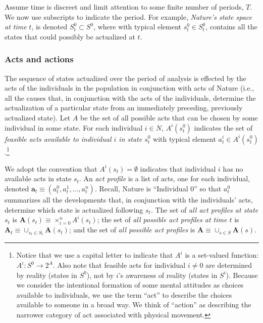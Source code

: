 \documentclass[
11pt,
titlepage,
reqno,
]{article}%
\theoremstyle{definition}
\begin{document}
	Assume time is discreet and limit attention to some finite number of periods, $T$. 
	We now use  subscripts to indicate the period. For example, \textit{Nature's state space at time} $t$, is denoted $S^0_t\subset S^0$, where with typical element $s^0_t\in S^0_t$, contains all the states that could possibly be actualized at $t$.

\subsubsection{Acts and actions\label{sec:dynamics}}
	The sequence of states actualized over the period of analysis is effected by the acts of the individuals in the population in conjunction with acts of Nature (i.e., all the causes that, in conjunction with the acts of the individuals, determine the actualization of a particular state from an immediately preceding, previously actualized state).
	Let $A$ be the set of all possible acts that can be chosen by some individual in some state.
	For each individual $i\in N$,  $A^i(s^0_t)$ indicates the set of \textit{feasible acts available to individual $i$ in state $s^0_t$} with typical element $a^i_t\in A^i(s^0_t)$.\footnote
	{
		Notice that we use a capital letter to indicate that $A^i$ is a set-valued function: $A^i:S^0\rightarrow 2^A$.
		Also note that feasible acts for individual $i\ne 0$ are determined by reality (states in $S^0$), not by $i$'s awareness of reality (states in $S^i$).
		Because we consider the intentional formation of some mental attitudes as choices available to individuals, we use the term ``act'' to describe the choices available to someone in a broad way.
		We think of ``action'' as describing the narrower category of act associated with physical movement.
	} 
	
	We adopt the convention that $A^i(s_t)=\emptyset$ indicates that individual $i$ has no available acts in state $s_t$.
	An \textit{act profile} is a list of acts, one for each individual, denoted  $\mathbf{a}_t\equiv(a^0_t,a^1_t,\ldots,a^n_t)$. 
	Recall, Nature is ``Individual 0'' so that $a^0_t$ summarizes all the developments that, in conjunction with the individuals' acts, determine which state is actualized following $s_t$. 
	The set of \textit{all act profiles at state $s_t$} is $\mathbf{A}(s_t)\equiv \times_{i=0}^n A^i(s_t)$; the set of \textit{all possible act profiles at time $t$} is  $\mathbf{A}_t\equiv \cup_{s_t\in S_t} \mathbf{A}(s_t)$; and the set of \textit{all possible act profiles} is $\mathbf{A}\equiv \cup_{s\in S} \mathbf{A}(s)$. 
	
\end{document}
